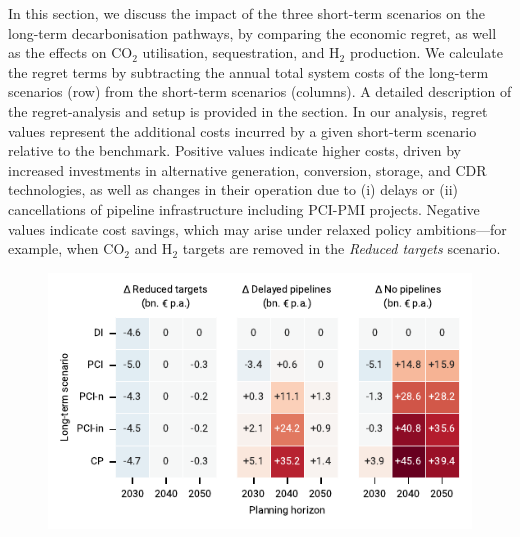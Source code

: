 \documentclass[pdflatex,sn-nature]{sn-jnl}%
\theoremstyle{thmstyleone}%
\theoremstyle{thmstyletwo}%
\theoremstyle{thmstylethree}%
\begin{document}
In this section, we discuss the impact of the three short-term scenarios on the long-term decarbonisation pathways, by comparing the economic regret, as well as the effects on CO$_2$ utilisation, sequestration, and H$_2$ production. We calculate the regret terms by subtracting the annual total system costs of the long-term scenarios (row) from the short-term scenarios (columns). A detailed description of the regret-analysis and setup is provided in the  section. In our analysis, regret values represent the additional costs incurred by a given short-term scenario relative to the benchmark. Positive values indicate higher costs, driven by increased investments in alternative generation, conversion, storage, and CDR technologies, as well as changes in their operation due to (i) delays or (ii) cancellations of pipeline infrastructure including PCI-PMI projects. Negative values indicate cost savings, which may arise under relaxed policy ambitions—for example, when CO$_2$ and H$_2$ targets are removed in the \textit{Reduced targets} scenario.

\begin{figure}[htbp]
  \centering
  \includegraphics{figures/regret_matrix}
  \label{fig:regret_matrix_results}
\end{figure}
\end{document}
